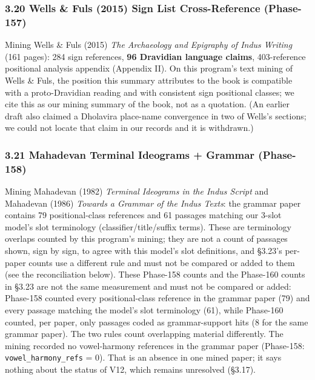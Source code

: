\documentclass[
]{article}
\begin{document}
\subsubsection{3.20 Wells \& Fuls (2015) Sign List Cross-Reference (Phase-157)}\label{wells-2015-sign-list-cross-reference-phase-157}

Mining Wells \& Fuls (2015) \emph{The Archaeology and Epigraphy of Indus
Writing} (161 pages): 284 sign references, \textbf{96 Dravidian language
claims}, 403-reference positional analysis appendix (Appendix II). On this program's text mining of Wells \& Fuls, the position this summary attributes to the book is compatible with a proto-Dravidian reading and with consistent sign positional classes; we cite this as our mining summary of the book, not as a quotation. (An earlier draft also claimed a Dholavira place-name convergence in two of Wells's sections; we could not locate that claim in our records and it is withdrawn.)

\subsubsection{3.21 Mahadevan Terminal Ideograms + Grammar
(Phase-158)}\label{mahadevan-terminal-ideograms-grammar-phase-158}

Mining Mahadevan (1982) \emph{Terminal Ideograms in the Indus Script}
and Mahadevan (1986) \emph{Towards a Grammar of the Indus Texts}: the grammar paper contains 79 positional-class references and 61 passages matching our 3-slot model's slot terminology (classifier/title/suffix terms). These are terminology overlaps counted by this program's mining; they are not a count of passages shown, sign by sign, to agree with this model's slot definitions, and §3.23's per-paper counts use a different rule and must not be compared or added to them (see the reconciliation below). These Phase-158 counts and the Phase-160 counts in §3.23 are not the same measurement and must not be compared or added: Phase-158 counted every positional-class reference in the grammar paper (79) and every passage matching the model's slot terminology (61), while Phase-160 counted, per paper, only passages coded as grammar-support hits (8 for the same grammar paper). The two rules count overlapping material differently. The mining recorded no vowel-harmony references in the grammar paper (Phase-158: \texttt{vowel\_harmony\_refs} = 0). That is an absence in one mined paper; it says nothing about the status of V12, which remains unresolved (§3.17).
\end{document}
